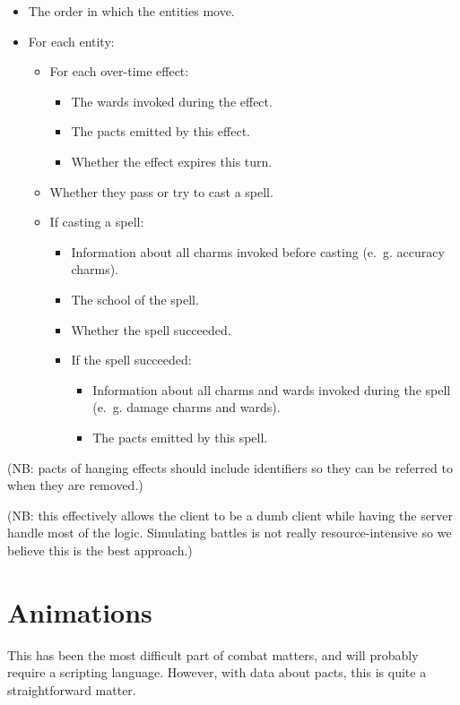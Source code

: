 \documentclass{article}
\begin{document}
\begin{itemize}
  \item The order in which the entities move.
  \item For each entity:
  \begin{itemize}
    \item For each over-time effect:
    \begin{itemize}
      \item The wards invoked during the effect.
      \item The pacts emitted by this effect.
      \item Whether the effect expires this turn.
    \end{itemize}
    \item Whether they pass or try to cast a spell.
    \item If casting a spell:
    \begin{itemize}
      \item Information about all charms invoked before casting (e.~g. accuracy charms).
      \item The school of the spell.
      \item Whether the spell succeeded.
      \item If the spell succeeded:
      \begin{itemize}
        \item Information about all charms and wards invoked during the spell (e.~g. damage charms and wards).
        \item The pacts emitted by this spell.
      \end{itemize}
    \end{itemize}
  \end{itemize}
\end{itemize}

(NB: pacts of hanging effects should include identifiers so they can be referred to when they are removed.)

(NB: this effectively allows the client to be a dumb client while having the server handle most of the logic. Simulating battles is not really resource-intensive so we believe this is the best approach.)

\section{Animations}

This has been the most difficult part of combat matters, and will probably require a scripting language. However, with data about pacts, this is quite a straightforward matter.
\end{document}
